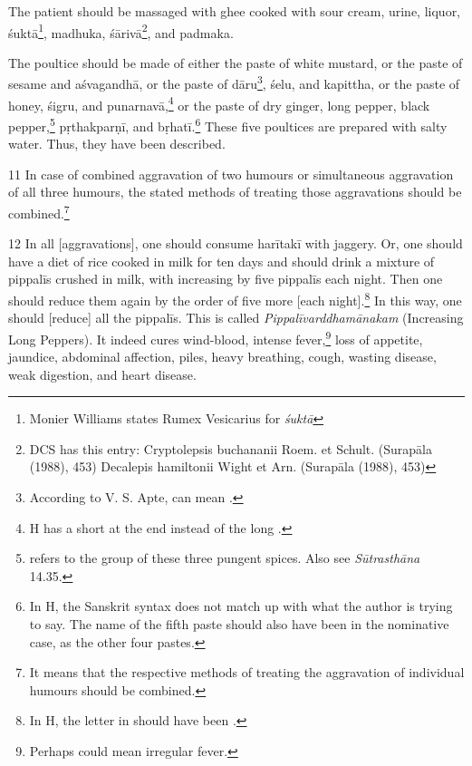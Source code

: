 \begin{translation}
    The patient should be massaged with ghee cooked with sour cream, urine, liquor, \gls{śuktā}\footnote{Monier Williams states Rumex Vesicarius for \textit{śuktā}}, \gls{madhuka}, \gls{śārivā}\footnote{DCS has this entry: Cryptolepsis buchananii Roem. et Schult. (Surapāla (1988), 453) Decalepis hamiltonii Wight et Arn. (Surapāla (1988), 453)}, and \gls{padmaka}.
    
     The poultice should be made of either the paste of white mustard, or the paste of sesame and \gls{aśvagandhā}, or the paste of \gls{dāru}\footnote{According to V. S. Apte,  can mean .}, \gls{śelu}, and \gls{kapittha}, or the paste of honey, \gls{śigru}, and \gls{punarnavā},\footnote{H has a short  at the end instead of the long .} or the paste of dry ginger, long pepper, black pepper,\footnote{ refers to the group of these three pungent spices. Also see \textit{Sūtrasthāna} 14.35.} \gls{pṛthakparṇī}, and \gls{bṛhatī}.\footnote{In H, the Sanskrit syntax does not match up with what the author is trying to say. The name of the fifth paste should also have been in the nominative case, as the other four pastes.} These five poultices are prepared with salty water. Thus, they have been described.

     \item[11] 
     In case of combined aggravation of two humours or simultaneous aggravation of all three humours, the stated methods of treating those aggravations should be combined.\footnote{It means that the respective methods of treating the aggravation of individual humours should be combined.}  

     \item[12] 
    In all [aggravations], one should consume \gls{harītakī} with jaggery. Or, one should have a diet of rice cooked in milk for ten days and should drink a mixture of \gls{pippalī}s crushed in milk, with increasing by five \gls{pippalī}s each night. Then one should reduce them again by the order of five more [each night].\footnote{In H, the letter  in  should have been .} In this way, one should [reduce] all the \gls{pippalī}s. This is called \textit{Pippalīvarddhamānakam} (Increasing Long Peppers). It indeed cures wind-blood, intense fever,\footnote{Perhaps  could mean irregular fever.} loss of appetite, jaundice, abdominal affection, piles, heavy breathing, cough, wasting disease, weak digestion, and heart disease. 


\end{translation}

